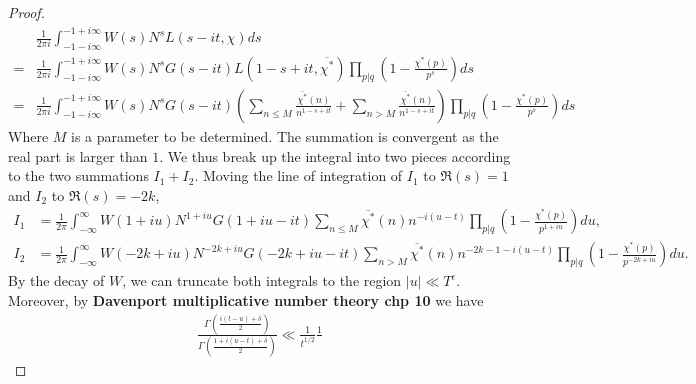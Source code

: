 \begin{proof}
\begin{align*}
   &\frac{1}{2\pi i}\int_{-1-i\infty}^{-1+i\infty}W(s)N^sL(s-it,\chi) ds \\=&\frac{1}{2\pi i}
   \int_{-1-i\infty}^{-1+i\infty}W(s)N^s
    G(s-it) L(1-s+it,\overline{\chi^*}) \prod_{p|q} \left(1-\frac{\chi^*(p)}{p^s}\right)ds\\
    =& \frac{1}{2\pi i}\int_{-1-i\infty}^{-1+i\infty}W(s)N^s
    G(s-it) 
    \left(\sum_{n\leq M}\frac{\overline{\chi^*}(n)}{n^{1-s+it}}+
    \sum_{n> M}\frac{\overline{\chi^*}(n)}{n^{1-s+it}}
   \right) \prod_{p|q} \left(1-\frac{\chi^*(p)}{p^s}\right)ds
\end{align*}
Where $M$ is a parameter to be determined. The summation is convergent as the real part is larger than $1$.
We thus break up the integral into two pieces according to the two summations $I_1+I_2$. Moving the line of integration of $I_1$ to $\Re(s)=1$ and $I_2$ to $\Re(s)=-2k$,
\begin{align*}
        I_1&= \frac{1}{2\pi}\int_{-\infty}^{\infty}W(1+iu)N^{1+iu}G(1+iu-it)\sum_{n\leq M}\overline{\chi^*}(n)n^{-i(u-t)}\prod_{p|q} \left(1-\frac{\chi^*(p)}{p^{1+iu}}\right)du,\\
        I_2&= \frac{1}{2\pi}\int_{-\infty}^{\infty}W(-2k+iu)N^{-2k+iu}G(-2k+iu-it)\sum_{n> M}\overline{\chi^*}(n)n^{-2k-1-i(u-t)}\prod_{p|q} \left(1-\frac{\chi^*(p)}{p^{-2k+iu}}\right)du.
\end{align*}
By the decay of $W$, we can truncate both integrals to the region $|u|\ll T^\epsilon$.
Moreover, by \textbf{Davenport multiplicative number theory chp 10}
we have \begin{align*}
    \frac{\Gamma\left(\frac{i(t-u)+\delta}{2}\right)}{\Gamma\left(\frac{1+i(u-t)+\delta}{2}\right)}\ll \frac{1}{t^{1/2}} \frac{1}{}
\end{align*}
\end{proof}
\fi